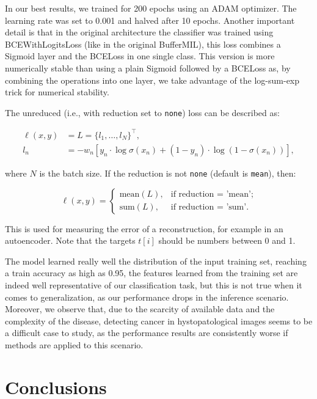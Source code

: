\documentclass[10pt,twocolumn]{article}
\begin{document}
In our best results, we trained for 200 epochs using an ADAM optimizer. The learning rate was set to 0.001 and halved after 10 epochs. Another important detail is that in the original architecture the classifier was trained using BCEWithLogitsLoss (like in the original BufferMIL), this loss combines a Sigmoid layer and the BCELoss in one single class. This version is more numerically stable than using a plain Sigmoid followed by a BCELoss as, by combining the operations into one layer, we take advantage of the log-sum-exp trick for numerical stability.

The unreduced (i.e., with reduction set to \texttt{none}) loss can be described as:

\begin{align*}
\ell(x, y) &= L = \{l_1, \dots, l_N\}^\top, \\
l_n &= -w_n \left[ y_n \cdot \log \sigma(x_n) 
+ (1 - y_n) \cdot \log (1 - \sigma(x_n)) \right],
\end{align*}

where \( N \) is the batch size. If the reduction is not \texttt{none} (default is \texttt{mean}), then:

\[
\ell(x, y) = 
\begin{cases}
\text{mean}(L), & \text{if reduction = 'mean'}; \\
\text{sum}(L), & \text{if reduction = 'sum'}.
\end{cases}
\]

This is used for measuring the error of a reconstruction, for example in an autoencoder. Note that the targets \( t[i] \) should be numbers between 0 and 1.


The model learned really well the distribution of the input training set, reaching a train accuracy as high as 0.95, the features learned from the training set are indeed well representative of our classification task, but this is not true when it comes to generalization, as our performance drops in the inference scenario. Moreover, we observe that, due to the scarcity of available data and the complexity of the disease, detecting cancer in hystopatological images seems to be a difficult case to study, as the performance results are consistently worse if methods are applied to this scenario.


\section{Conclusions} \label{conclusions}

\end{document}
